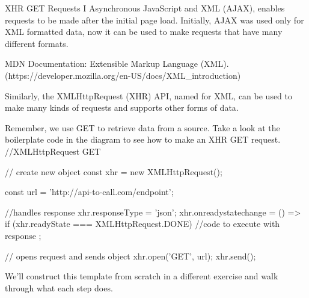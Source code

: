 XHR GET Requests I
    Asynchronous JavaScript and XML (AJAX), enables requests to be made after the initial page load. Initially, AJAX was used only for XML formatted data, now it can be used to make requests that have many different formats.

    MDN Documentation: Extensible Markup Language (XML).(https://developer.mozilla.org/en-US/docs/XML_introduction)

    Similarly, the XMLHttpRequest (XHR) API, named for XML, can be used to make many kinds of requests and supports other forms of data.

    Remember, we use GET to retrieve data from a source. Take a look at the boilerplate code in the diagram to see how to make an XHR GET request.
        //XMLHttpRequest GET

        // create new object
        const xhr = new XMLHttpRequest();
        
        const url = 'http://api-to-call.com/endpoint';

        //handles response
        xhr.responseType = 'json';
        xhr.onreadystatechange = () => {
            if (xhr.readyState === XMLHttpRequest.DONE) {
                //code to execute with response
            }
        };

        // opens request and sends object
        xhr.open('GET', url);
        xhr.send();
        

    We’ll construct this template from scratch in a different exercise and walk through what each step does.